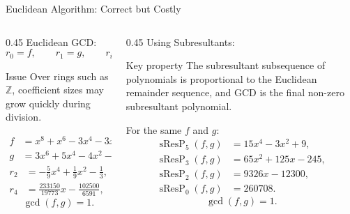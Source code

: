 \documentclass[aspectratio=169]{beamer}
\newcommand{\sResP}{\operatorname{sResP}}
\newcommand{\Z}{\mathbb{Z}}
\begin{document}
\begin{frame}{Euclidean Algorithm: Correct but Costly}
\footnotesize
\begin{columns}
  \begin{column}{0.45\textwidth}
    Euclidean GCD: \\
    \vspace{-2em}
    \[
      r_0=f, \qquad r_1=g, \qquad r_{i+1}=r_{i-1}\bmod r_i.
    \]
    \vspace{-2em}
    \pause
    \begin{alertblock}{Issue}
    Over rings such as $\Z$, coefficient sizes may grow quickly during division.
    \end{alertblock}
    \pause
    \vspace{-1em}
    \[
    \begin{aligned}
    f&=x^8+x^6-3x^4-3x^3+8x^2+2x-5,\\
    g&=3x^6+5x^4-4x^2-9x+21.
    \end{aligned}
    \]
    \vspace{1em}
    \[
    \begin{aligned}
    r_2 &= -\frac{5}{9}x^4+\frac{1}{9}x^2-\frac{1}{3}, &
    r_3 &= -\frac{117}{25}x^2-9x+\frac{441}{25},\\
    r_4 &= \frac{233150}{19773}x-\frac{102500}{6591}, &
    r_5 &= -\frac{1288744821}{543589225}.
    \end{aligned}
    \]
    \vspace{1em}
    \[
      \gcd(f,g)=1.
    \]
  \end{column}
  \pause
  \begin{column}{0.45\textwidth}
    Using Subresultants:
    \begin{block}{Key property}
    The subresultant subsequence of polynomials is proportional to the Euclidean remainder sequence, and GCD is the final non-zero subresultant polynomial.
    \end{block}
    \pause
    For the same $f$ and $g$:
    \[
    \begin{aligned}
    \sResP_5(f,g) &= 15x^4-3x^2+9, \\
    \sResP_3(f,g) &= 65x^2+125x-245,\\
    \sResP_2(f,g) &= 9326x-12300, \\
    \sResP_0(f,g) &= 260708.
    \end{aligned}
    \]
    \vspace{0.5em}
    \[
      \gcd(f,g)=1.
    \]
  \end{column}
\end{columns}
\end{frame}
\end{document}
